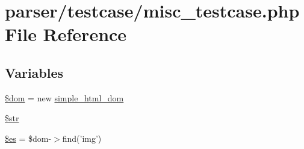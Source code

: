 \hypertarget{misc__testcase_8php}{\section{parser/testcase/misc\+\_\+testcase.php File Reference}
\label{misc__testcase_8php}
}
\subsection*{Variables}
\begin{DoxyCompactItemize}
\item 
\hyperlink{misc__testcase_8php_a46127a794280dd592812c25b62af34b0}{\$dom} = new \hyperlink{classsimple__html__dom}{simple\+\_\+html\+\_\+dom}
\item 
\hyperlink{misc__testcase_8php_a7542d95618011800c61773127fa625cf}{\$str}
\item 
\hyperlink{misc__testcase_8php_a388cbda27103d2baee3997798d1f2744}{\$es} = \$dom-\/$>$find('img')
\end{DoxyCompactItemize}


